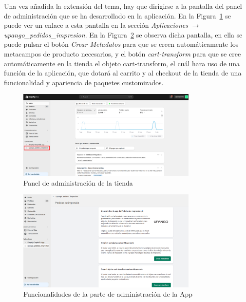 \documentclass[12pt]{article}
\begin{document}
Una vez añadida la extensión del tema, hay que dirigirse a la pantalla del panel de administración que se ha desarrollado en la aplicación. En la Figura~\ref{fig:PanelAdministracion} se puede
ver un enlace a esta pantalla en la sección \textit{Aplicaciones} $\rightarrow$  \textit{upango\_pedidos\_impresion}. En la Figura~\ref{fig:FuncionalidadAdministracion} se observa dicha pantalla, en ella se puede pulsar el botón \textit{Crear Metadatos} para que se creen 
automáticamente los metacampos de producto necesarios, y el botón \textit{cart-transform} para que se cree automáticamente en la tienda el objeto cart-transform, el cuál hara uso de una función de la aplicación, que 
dotará al carrito y al checkout de la tienda de una funcionalidad y apariencia de paquetes customizados.

\begin{figure}[ht]
    \centering
    \includegraphics[width=0.8\textwidth]{imagenes/ManualUsuario/PaginaAdministracion.png}
    \caption{\label{fig:PanelAdministracion}Panel de administración de la tienda}
    \vspace{\fill}
\end{figure}

\begin{figure}[ht]
    \centering
    \includegraphics[width=0.8\textwidth]{imagenes/ManualUsuario/FuncionalidadPaginaAdministracion.png}
    \caption{\label{fig:FuncionalidadAdministracion}Funcionalidades de la parte de administración de la App}
    \vspace{\fill}
\end{figure}
\end{document}
